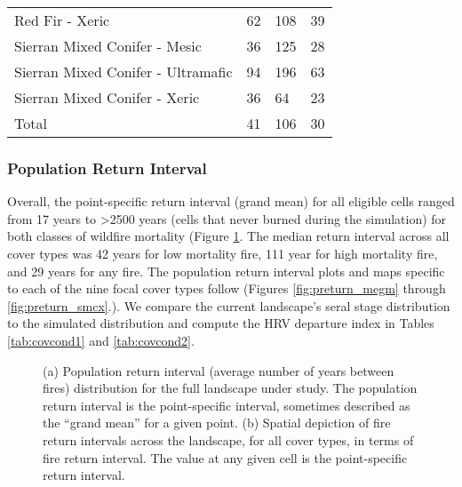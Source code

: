 \begin{table}[!htbp]
\begin{tabular}{@{}llll@{}}
Red Fir - Xeric                              & 62                          & 108                          & 39                 \\
Sierran Mixed Conifer - Mesic                & 36                          & 125                          & 28                 \\
Sierran Mixed Conifer - Ultramafic           & 94                          & 196                          & 63                 \\
Sierran Mixed Conifer - Xeric                & 36                          & 64                           & 23                 \\
Total                                        & 41                          & 106                          & 30                 \\ \bottomrule
\end{tabular}
\end{table}


\subsubsection{Population Return Interval}
Overall, the point-specific return interval (grand mean) for all eligible cells ranged from 17 years to \textgreater 2500 years (cells that never burned during the simulation) for both classes of wildfire mortality (Figure \ref{fig:preturn}. The median return interval across all cover types was 42 years for low mortality fire, 111 year for high mortality fire, and 29 years for any fire. The population return interval plots and maps specific to each of the nine focal cover types follow (Figures \ref{fig:preturn_megm} through \ref{fig:preturn_smcx}.). We compare the current landscape's seral stage distribution to the simulated distribution and compute the HRV departure index in Tables \ref{tab:covcond1} and \ref{tab:covcond2}.
\begin{figure}[!htbp]
  \centering
  \qquad
  \caption{(a) Population return interval (average number of years between fires) distribution for the full landscape under study. The population return interval is the point-specific interval, sometimes described as the ``grand mean'' for a given point. (b) Spatial depiction of fire return intervals across the landscape, for all cover types, in terms of fire return interval. The value at any given cell is the point-specific return interval.}
  \label{fig:preturn}
\end{figure}



